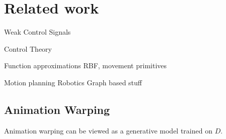 \section{Related work}

Weak Control Signals

Control Theory

Function approximations 
    RBF, movement primitives

Motion planning
    Robotics
    Graph based stuff



\subsection{Animation Warping}
Animation warping can be viewed as a generative model trained on $D$. 

